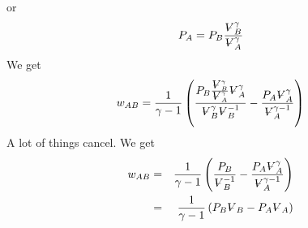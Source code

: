 \documentclass{article}
\begin{document}
or 
\[
P_{A}=P_{B}\frac{%
\ooalign{\hfil$V$\hfil\cr\kern0.1em--\hfil\cr}%
_{B}^{\gamma }}{%
\ooalign{\hfil$V$\hfil\cr\kern0.1em--\hfil\cr}%
_{A}^{\gamma }} 
\]%
We get 
\[
w_{AB}=\frac{1}{\gamma -1}\left( \frac{P_{B}\frac{%
\ooalign{\hfil$V$\hfil\cr\kern0.1em--\hfil\cr}%
_{B}^{\gamma }}{%
\ooalign{\hfil$V$\hfil\cr\kern0.1em--\hfil\cr}%
_{A}^{\gamma }}%
\ooalign{\hfil$V$\hfil\cr\kern0.1em--\hfil\cr}%
_{A}^{\gamma }}{%
\ooalign{\hfil$V$\hfil\cr\kern0.1em--\hfil\cr}%
_{B}^{\gamma }%
\ooalign{\hfil$V$\hfil\cr\kern0.1em--\hfil\cr}%
_{B}^{-1}}-\frac{P_{A}%
\ooalign{\hfil$V$\hfil\cr\kern0.1em--\hfil\cr}%
_{A}^{\gamma }}{%
\ooalign{\hfil$V$\hfil\cr\kern0.1em--\hfil\cr}%
_{A}^{\gamma -1}}\right) 
\]%
A lot of things cancel. We get%
\begin{eqnarray*}
w_{AB} &=&\frac{1}{\gamma -1}\left( \frac{P_{B}}{%
\ooalign{\hfil$V$\hfil\cr\kern0.1em--\hfil\cr}%
_{B}^{-1}}-\frac{P_{A}%
\ooalign{\hfil$V$\hfil\cr\kern0.1em--\hfil\cr}%
_{A}^{\gamma }}{%
\ooalign{\hfil$V$\hfil\cr\kern0.1em--\hfil\cr}%
_{A}^{\gamma -1}}\right) \\
&=&\frac{1}{\gamma -1}\left( P_{B}%
\ooalign{\hfil$V$\hfil\cr\kern0.1em--\hfil\cr}%
_{B}-P_{A}%
\ooalign{\hfil$V$\hfil\cr\kern0.1em--\hfil\cr}%
_{A}\right)
\end{eqnarray*}%
\end{document}
